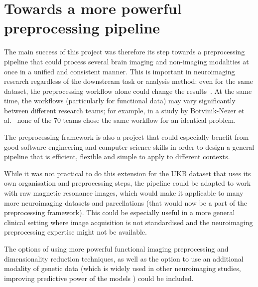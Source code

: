 \section{Towards a more powerful preprocessing pipeline}
The main success of this project was therefore its step towards a preprocessing pipeline that could process several brain imaging and non-imaging modalities at once in a unified and consistent manner. This is important in neuroimaging research regardless of the downstream task or analysis method: even for the same dataset, the preprocessing workflow alone could change the results~\cite{salehi2020there}. At the same time, the workflows (particularly for functional data) may vary significantly between different research teams; for example, in a study by Botvinik-Nezer et al.~\cite{botvinik2019variability} none of the 70 teams chose the same workflow for an identical problem.

The preprocessing framework is also a project that could especially benefit from good software engineering and computer science skills in order to design a general pipeline that is efficient, flexible and simple to apply to different contexts.

While it was not practical to do this extension for the UKB dataset that uses its own organisation and preprocessing steps, the pipeline could be adapted to work with raw magnetic resonance images, which would make it applicable to many more neuroimaging datasets and parcellations (that would now be a part of the preprocessing framework). This could be especially useful in a more general clinical setting where image acquisition is not standardised and the neuroimaging preprocessing expertise might not be available.

The options of using more powerful functional imaging preprocessing and dimensionality reduction techniques, as well as the option to use an additional modality of genetic data (which is widely used in other neuroimaging studies, improving predictive power of the models \cite{cole2018brain,parisot2018disease}) could be included.



